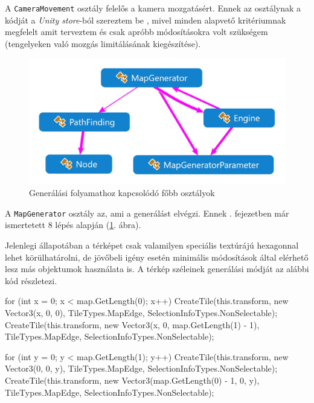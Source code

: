 A \texttt{CameraMovement} osztály felelős a kamera mozgatásért. Ennek az osztálynak a kódját a \textit{Unity store}-ból szereztem be \cite{RTS_Camera}, mivel minden alapvető kritériumnak megfelelt amit terveztem és csak apróbb módosításokra volt szükségem (tengelyeken való mozgás limitálásának kiegészítése). 

\begin{figure}[h!]
\centering
\includegraphics[scale=0.3]{kepek/White_Generalas.JPG}
\caption{Generálási folyamathoz kapcsolódó főbb osztályok}
\label{fig:generalas}
\end{figure}

\newpage

A \texttt{MapGenerator} osztály az, ami a generálást elvégzi. Ennek . fejezetben már ismertetett 8 lépés alapján (\ref{fig:generalas}. ábra).


Jelenlegi állapotában a térképet csak valamilyen speciális textúrájú hexagonnal lehet körülhatárolni, de jövőbeli igény esetén minimális módosítások által elérhető lesz más objektumok használata is. A térkép széleinek generálási módját az alábbi kód részletezi.
\begin{cpp}
for (int x = 0; x < map.GetLength(0); x++)
{
   CreateTile(this.transform, new Vector3(x, 0, 0),
   TileTypes.MapEdge, SelectionInfoTypes.NonSelectable);
   CreateTile(this.transform, new Vector3(x, 0, map.GetLength(1) - 1),
   TileTypes.MapEdge, SelectionInfoTypes.NonSelectable);
}

for (int y = 0; y < map.GetLength(1); y++)
{
   CreateTile(this.transform, new Vector3(0, 0, y),
   TileTypes.MapEdge, SelectionInfoTypes.NonSelectable);
   CreateTile(this.transform, new Vector3(map.GetLength(0) - 1, 0, y),
   TileTypes.MapEdge, SelectionInfoTypes.NonSelectable);
}
\end{cpp}

